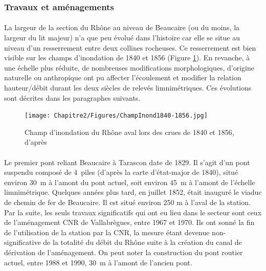 \FloatBarrier

		\subsubsection{Travaux et aménagements}
    	\label{subsubsec:TravauxPt}
    
    \paragraph{} La largeur de la section du Rhône au niveau de Beaucaire (ou du moins, la largeur du lit majeur) n'a que peu évolué dans l'histoire car elle se situe au niveau d'un resserrement entre deux collines rocheuses. Ce resserrement est bien visible sur les champs d'inondation de 1840 et 1856 (Figure \ref{Champ1856}). En revanche, à une échelle plus réduite, de nombreuses modifications morphologiques, d'origine naturelle ou anthropique ont pu affecter l'écoulement et modifier la relation hauteur/débit durant les deux siècles de relevés limnimétriques. Ces évolutions sont décrites dans les paragraphes suivants.
        
    \begin{figure}[h]
        \centering
        \texttt{[image: Chapitre2/Figures/ChampInond1840-1856.jpg]}
        \caption{Champ d'inondation du Rhône aval lors des crues de 1840 et 1856, d'après \citet{parde_regime_1925}}
        \label{Champ1856}
    \end{figure}
    

	\paragraph{} Le premier pont reliant Beaucaire à Tarascon date de 1829. Il s'agit d'un pont suspendu composé de 4~piles (d'après la carte d'état-major de 1840), situé environ 30~m à l'amont du pont actuel, soit environ 45~m à l'amont de l'échelle limnimétrique. Quelques années plus tard, en juillet 1852, était inauguré le viaduc de chemin de fer de Beaucaire. Il est situé environ 250 m à l'aval de la station. Par la suite, les seuls travaux significatifs qui ont eu lieu dans le secteur sont ceux de l'aménagement CNR de Vallabrègues, entre 1967 et 1970. Ils ont sonné la fin de l'utilisation de la station par la CNR, la mesure étant devenue non-significative de la totalité du débit du Rhône suite à la création du canal de dérivation de l'aménagement. On peut noter la construction du pont routier actuel, entre 1988 et 1990, 30~m à l'amont de l'ancien pont. 
        


